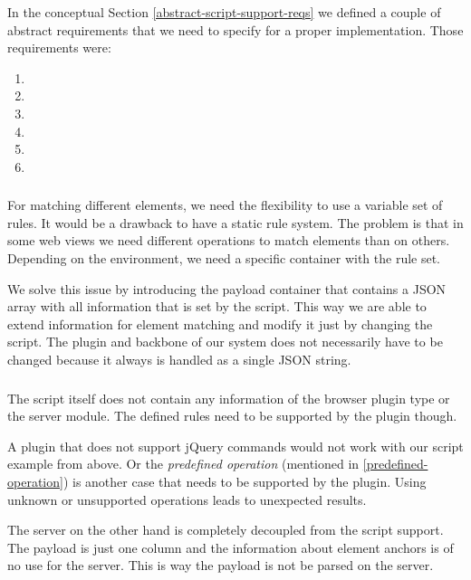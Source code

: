 In the conceptual Section \ref{abstract-script-support-reqs} we defined a couple of abstract requirements that we need to specify for a proper implementation. Those requirements were:

\begin{enumerate}
\item \reqSi
\item \reqSii
\item \reqSiii
\item \reqSiv
\item \reqSv
\item \reqSvi
\end{enumerate}

\subsubsection[Information Container]{\reqSi}

For matching different elements, we need the flexibility to use a variable set of rules. It would be a drawback to have a static rule system. The problem is that in some web views we need different operations to match elements than on others. Depending on the environment, we need a specific container with the rule set. 

We solve this issue by introducing the payload container that contains a JSON array with all information that is set by the script. This way we are able to extend information for element matching and modify it just by changing the script. The plugin and backbone of our system does not necessarily have to be changed because it always is handled as a single JSON string.

\subsubsection[Decoupling]{\reqSii}\label{decoupled-req}

The script itself does not contain any information of the browser plugin type or the server module. The defined rules need to be supported by the plugin though. 

A plugin that does not support jQuery commands would not work with our script example from above. Or the \emph{predefined operation} (mentioned in \ref{predefined-operation}) is another case that needs to be supported by the plugin. Using unknown or unsupported operations leads to unexpected results.  

The server on the other hand is completely decoupled from the script support. The payload is just one column and the information about element anchors is of no use for the server. This is way the payload is not be parsed on the server. 

